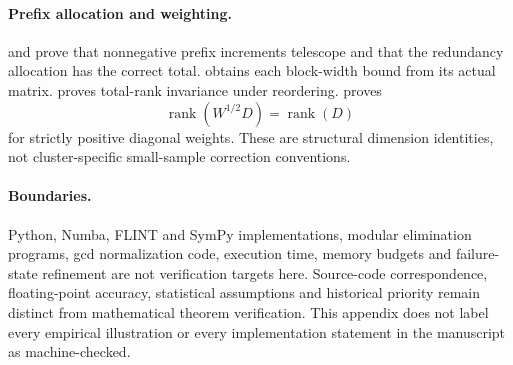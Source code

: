 \paragraph{Prefix allocation and weighting.}
 and  prove
that nonnegative prefix increments telescope and that the redundancy allocation
has the correct total.  obtains each
block-width bound from its actual matrix. 
proves total-rank invariance under reordering.
 proves
\[
 \operatorname{rank}(W^{1/2}D)=\operatorname{rank}(D)
\]
for strictly positive diagonal weights. These are structural dimension identities,
not cluster-specific small-sample correction conventions.

\paragraph{Boundaries.}
Python, Numba, FLINT and SymPy implementations, modular elimination programs,
gcd normalization code, execution time, memory budgets and failure-state
refinement are not verification targets here. Source-code correspondence,
floating-point accuracy, statistical assumptions and historical priority
remain distinct from mathematical theorem verification. This appendix does
not label every empirical illustration or every implementation statement in
the manuscript as machine-checked.
